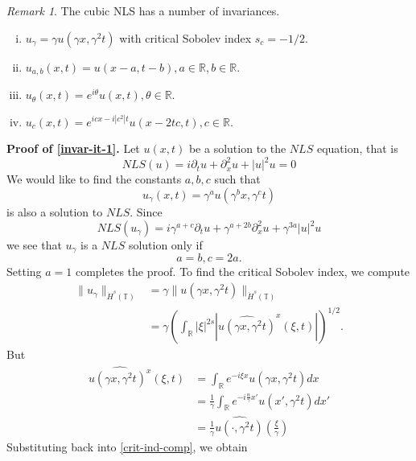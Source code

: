 \documentclass[12pt,reqno]{amsart}
\numberwithin{equation}{section}  %
\numberwithin{figure}{section}
\newcommand{\rr}{\mathbb{R}}
\newcommand{\ci}{\mathbb{T}}
\newcommand{\wh}{\widehat}
\newcommand{\p}{\partial}
\theoremstyle{plain}
\theoremstyle{definition}
\theoremstyle{remark}
\newtheorem{remark}{Remark}
\begin{document}
\begin{framed}
\begin{remark}
The cubic NLS has a number of invariances. 
\begin{enumerate}[(i)]
  \item{ $u_{\gamma} = \gamma u(\gamma x, \gamma^{2} t)$ with critical Sobolev index
    $s_{c} = -1/2$}.
    \label{invar-it-1}
  \item{ $u_{a,b}(x,t) = u(x -a, t - b), a \in \rr, b \in \rr$}.
    \label{invar-it-2}
  \item{ $u_{\theta}(x,t) = e^{i \theta} u(x, t), \theta \in \rr$}.
    \label{invar-it-3}
  \item{ $u_{c}(x,t) = e^{icx - i| c^{2} |t}u(x -2tc, t), c \in \rr$}.
    \label{invar-it-4}
\end{enumerate}
{\bf Proof of \eqref{invar-it-1}.}
Let $u(x, t)$ be a solution to the $NLS$ equation, that is
%
$$
NLS(u)=
i \p_t u + \p_x^{2} u  + | u |^{2} u  = 0
$$
%
We would like to find the constants
$a, b, c$ such that
\[
u_\gamma (x, t) = \gamma^a u(\gamma^b x, \gamma^c t)
\]
is also a solution to $NLS$.  Since 
$$
NLS(u_\gamma)=
i \gamma^{a + c} \p_t u + \gamma^{a + 2b} \p_x^{2} u  + \gamma^{3a} | u |^{2} u 
$$
we see that $u_\gamma$ is a $NLS$ solution only if
$$
a=b, c = 2a.
$$
Setting $a=1$ completes the proof. 
To find the critical Sobolev index, we compute
%
%
\begin{equation}
\begin{split}
  \| u_{\gamma} \|_{\dot{H}^s(\ci)} 
  & = \gamma \| u(\gamma x, \gamma^2 t) \|_{\dot{H}^{s}(\ci)}
  \\
  & = \gamma \left( \int_{\rr} | \xi |^{2s} | \wh{u(\gamma x,
  \gamma^{2} t)}^x (\xi, t)| \right)^{1/2}.
\end{split}
\label{crit-ind-comp}
\end{equation}
%
But
%
%
\begin{equation*}
\begin{split}
  \wh{u(\gamma x, \gamma^{2}t)^x}(\xi, t)
  & = \int_{\rr}e^{-i\xi x}u(\gamma x, \gamma^2 t) dx
  \\
  & = \frac{1}{\gamma} \int_{\rr}e^{-i \frac{n}{\gamma} x'}u(x',
  \gamma^{2} t) dx'
  \\
  & = \frac{1}{\gamma} \wh{u(\cdot, \gamma^{2}t)}(\frac{\xi}{\gamma})
\end{split}
\end{equation*}
%
%
Substituting back into \eqref{crit-ind-comp}, we obtain
%
%
\begin{equation*}
\begin{split}

\end{split}
\end{equation*}
\end{remark}
\end{framed}
\end{document}

